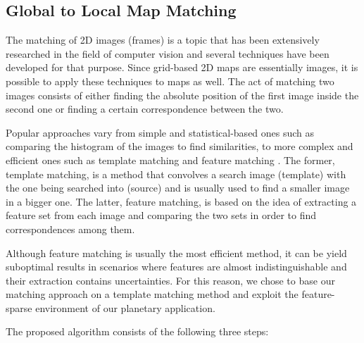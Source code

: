\subsection{Global to Local Map Matching} \label{map_matching}

The matching of 2D images (frames) is a topic that has been extensively
researched in the field of computer vision and several techniques have
been developed for that purpose.
Since grid-based 2D maps are essentially images, it is possible to
apply these techniques to maps as well.
The act of matching two images consists of either finding the absolute
position of the first image inside the second one or finding a certain
correspondence between the two.

Popular approaches vary from simple and statistical-based ones such as
comparing the histogram of the images to find similarities, to
more complex and efficient ones such as template matching and feature
matching \parencite{Jayanthi2016}.
The former, template matching, is a method that convolves a search
image (template) with the one being searched into (source) and is usually
used to find a smaller image in a bigger one.
The latter, feature matching, is based on the idea of extracting a feature
set from each image and comparing the two sets in order to find
correspondences among them.

Although feature matching is usually the most efficient method,
it can be yield suboptimal results in scenarios where features are
almost indistinguishable and their extraction contains uncertainties.
For this reason, we chose to base our matching approach on a
template matching method and exploit the feature-sparse environment
of our planetary application.

The proposed algorithm consists of the following three steps:

